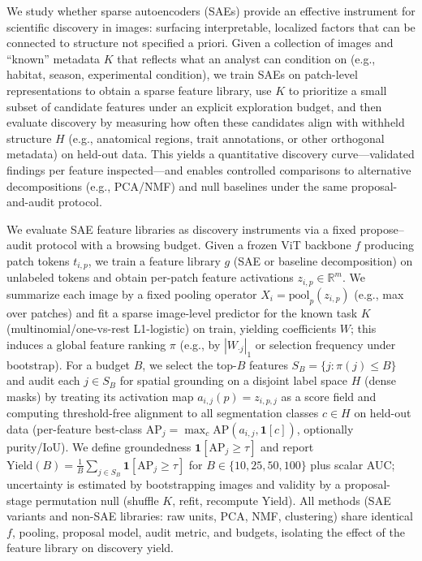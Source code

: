 \documentclass{article}
\theoremstyle{plain}
\theoremstyle{definition}
\theoremstyle{remark}
\begin{document}
We study whether sparse autoencoders (SAEs) provide an effective instrument for scientific discovery in images: surfacing interpretable, localized factors that can be connected to structure not specified a priori.
Given a collection of images and ``known'' metadata $K$ that reflects what an analyst can condition on (e.g., habitat, season, experimental condition), we train SAEs on patch-level representations to obtain a sparse feature library, use $K$ to prioritize a small subset of candidate features under an explicit exploration budget, and then evaluate discovery by measuring how often these candidates align with withheld structure $H$ (e.g., anatomical regions, trait annotations, or other orthogonal metadata) on held-out data.
This yields a quantitative discovery curve—validated findings per feature inspected—and enables controlled comparisons to alternative decompositions (e.g., PCA/NMF) and null baselines under the same proposal-and-audit protocol.

We evaluate SAE feature libraries as discovery instruments via a fixed propose–audit protocol with a browsing budget.
Given a frozen ViT backbone $f$ producing patch tokens $t_{i,p}$, we train a feature library $g$ (SAE or baseline decomposition) on unlabeled tokens and obtain per-patch feature activations $z_{i,p}\in\mathbb{R}^m$.
We summarize each image by a fixed pooling operator $X_i=\mathrm{pool}_p(z_{i,p})$ (e.g., max over patches) and fit a sparse image-level predictor for the known task $K$ (multinomial/one-vs-rest L1-logistic) on train, yielding coefficients $W$; this induces a global feature ranking $\pi$ (e.g., by $|W_{\cdot j}|_1$ or selection frequency under bootstrap).
For a budget $B$, we select the top-$B$ features $S_B=\{j:\pi(j)\le B\}$ and audit each $j\in S_B$ for spatial grounding on a disjoint label space $H$ (dense masks) by treating its activation map $a_{i,j}(p)=z_{i,p,j}$ as a score field and computing threshold-free alignment to all segmentation classes $c\in H$ on held-out data (per-feature best-class $\mathrm{AP}_j=\max_c \mathrm{AP}(a_{i,j},\mathbf{1}[c])$, optionally purity/IoU).
We define groundedness $\mathbf{1}[\mathrm{AP}_j\ge\tau]$ and report $\mathrm{Yield}(B)=\frac{1}{B}\sum_{j\in S_B}\mathbf{1}[\mathrm{AP}_j\ge\tau]$ for $B\in\{10,25,50,100\}$ plus scalar AUC; uncertainty is estimated by bootstrapping images and validity by a proposal-stage permutation null (shuffle $K$, refit, recompute Yield).
All methods (SAE variants and non-SAE libraries: raw units, PCA, NMF, clustering) share identical $f$, pooling, proposal model, audit metric, and budgets, isolating the effect of the feature library on discovery yield.
\end{document}
